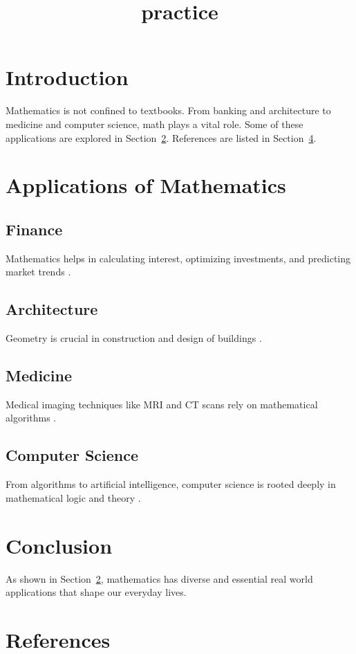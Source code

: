 \documentclass{article}
\title{practice}
\begin{document}
 \tableofcontents
 \newpage

 \section{Introduction}
 \label{sec:intro}
 Mathematics is not confined to textbooks. From banking and architecture to medicine and computer science, math plays a vital role. Some of these applications are explored in Section~\ref{sec:applications}. References are listed in Section~\ref{sec:refs}.
 \section{Applications of Mathematics}
 \label{sec:applications}
 \subsection{Finance}
 Mathematics helps in calculating interest, optimizing investments, and predicting market trends \cite{finance}.
 \subsection{Architecture}
 Geometry is crucial in construction and design of buildings \cite{architecture}.
 \subsection{Medicine}
 Medical imaging techniques like MRI and CT scans rely on mathematical algorithms \cite{medicine}.
 \subsection{Computer Science}
 From algorithms to artificial intelligence, computer science is rooted deeply in mathematical logic and theory \cite{cs}.
 \section{Conclusion}
 \label{sec:conclusion}
 As shown in Section~\ref{sec:applications}, mathematics has diverse and essential real
world applications that shape our everyday lives.
 \section{References}
 \label{sec:refs}
 
 
 
\end{document}

